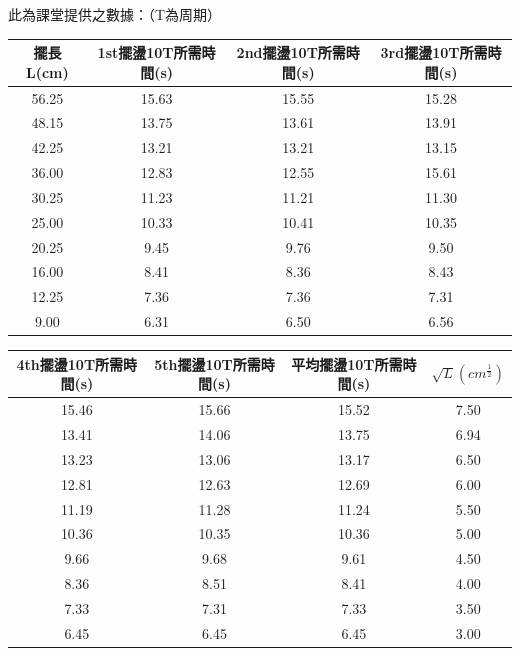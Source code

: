\documentclass[12pt,a4paper]{article}
\begin{document}
\begin{CJK}{UTF8}{bkai}
此為課堂提供之數據：{\color{gray}（T為周期）}

\renewcommand{\arraystretch}{1.5}
\begin{center}
\begin{tabular}{|c|c|c|c|}
    \hline
    擺長L(cm)& 1st擺盪10T所需時間(s) & 2nd擺盪10T所需時間(s) & 3rd擺盪10T所需時間(s) \\
    \hline
    56.25 & 15.63 & 15.55 & 15.28 \\
    \hline
    48.15 & 13.75 & 13.61 & 13.91 \\
    \hline
    42.25 & 13.21 & 13.21 & 13.15 \\
    \hline
    36.00 & 12.83 & 12.55 & 15.61 \\
    \hline
    30.25 & 11.23 & 11.21 & 11.30 \\
    \hline
    25.00 & 10.33 & 10.41 & 10.35 \\
    \hline
    20.25&9.45&9.76&9.50\\
    \hline
    16.00&8.41&8.36&8.43\\
    \hline
    12.25&7.36&7.36&7.31\\
    \hline
    9.00&6.31&6.50&6.56\\
    \hline
\end{tabular}
\end{center}

\begin{center}
\begin{tabular}{|c|c|c|c|}
    \hline
    4th擺盪10T所需時間(s) & 5th擺盪10T所需時間(s) & 平均擺盪10T所需時間(s) & $\sqrt{L}(cm^\frac{1}{2})$\\
    \hline
    15.46&15.66&15.52&7.50\\
    \hline
    13.41&14.06&13.75&6.94\\
    \hline
    13.23&13.06&13.17&6.50\\
    \hline
    12.81&12.63&12.69&6.00\\
    \hline
    11.19&11.28&11.24&5.50\\
    \hline
    10.36&10.35&10.36&5.00\\
    \hline
    9.66&9.68&9.61&4.50\\
    \hline
    8.36&8.51&8.41&4.00\\
    \hline
    7.33&7.31&7.33&3.50\\
    \hline
    6.45&6.45&6.45&3.00\\
    \hline
\end{tabular}
\end{center}


\end{CJK}
\end{document}
